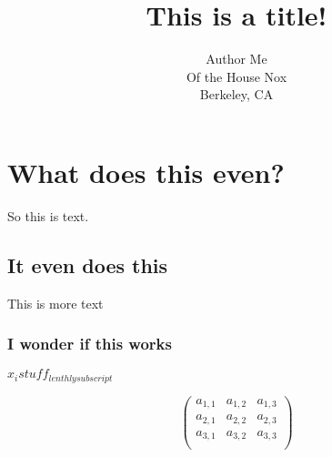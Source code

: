 \documentclass{article}
\begin{document}
\title{This is a title!}
\author{Author Me\\
        Of the House Nox\\
        Berkeley, CA}

\section{What does this even?}
    So this is text.
\subsection{It even does this}
    This is more text

\subsubsection{I wonder if this works}
    $x_i stuff_{lenthly subscript}$

    \begin{equation}
        \left(
            \begin{array}{ccc} %
                a_{1,1} & a_{1,2} & a_{1,3} \\ %
                a_{2,1} & a_{2,2} & a_{2,3} \\ %
                a_{3,1} & a_{3,2} & a_{3,3} \\ %
            \end{array}
        \right)


    \end{equation}
\end{document}
